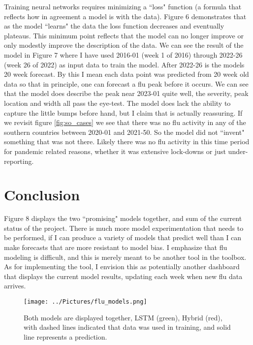 \documentclass[12pt,a4paper,english]{article}
\begin{document}
Training neural networks requires minimizing a ``loss" function (a formula that reflects how in agreement a model is with the data). Figure 6 demonstrates that as the model ``learns" the data the loss function decreases and eventually plateaus. This minimum point reflects that the model can no longer improve or only modestly improve the description of the data. We can see the result of the model in Figure 7 where I have used 2016-01 (week 1 of 2016) through 2022-26 (week 26 of 2022) as input data to train the model. After 2022-26 is the models 20 week forecast. By this I mean each data point was predicted from 20 week old data so that in principle, one can forecast a flu peak before it occurs. We can see that the model does describe the peak near 2023-01 quite well, the severity, peak location and width all pass the eye-test. The model does lack the ability to capture the little bumps before hand, but I claim that is actually reassuring. If we revisit figure \ref{fig:so_cases} we see that there was no flu activity in any of the southern countries between 2020-01 and 2021-50. So the model did not ``invent" something that was not there. Likely there was no flu activity in this time period for pandemic related reasons, whether it was extensive lock-downs or just under-reporting.

\section{Conclusion}

Figure 8 displays the two ``promising" models together, and sum of the current status of the project. There is much more model experimentation that needs to be performed, if I can produce a variety of models that predict well than I can make forecasts that are more resistant to model bias. I emphasize that flu modeling is difficult, and this is merely meant to be another tool in the toolbox. As for implementing the tool, I envision this as potentially another dashboard that displays the current model results, updating each week when new flu data arrives.


	\begin{figure}[h!]
		\centering
		\texttt{[image: ../Pictures/flu\_models.png]}
		\caption{Both models are displayed together, LSTM (green), Hybrid (red), with dashed lines indicated that data was used in training, and solid line represents a prediction.}
		\label{fig:flu_models}
	\end{figure}
\end{document}
